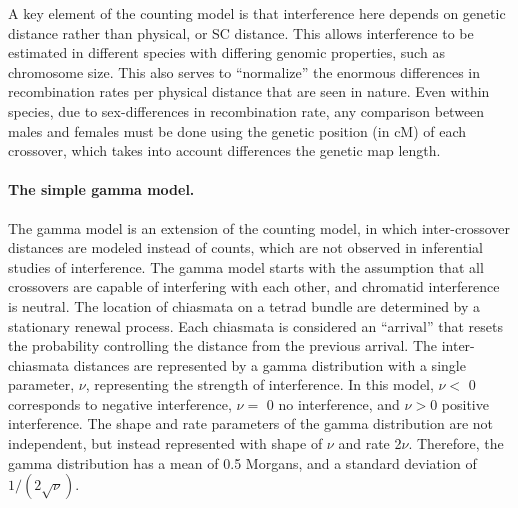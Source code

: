 A key element of the counting model is that interference here depends on genetic distance rather than physical, or SC distance.
This allows interference to be estimated in different species with differing genomic properties, such as chromosome size.
This also serves to ``normalize'' the enormous differences in recombination rates per physical distance that are seen in nature.
Even within species, due to sex-differences in recombination rate, any comparison between males and females must be done using the genetic position (in cM) of each crossover, which takes into account differences the genetic map length.




\paragraph{The simple gamma model.} \label{cointTPM}

The gamma model is an extension of the counting model, in which inter-crossover distances are modeled instead of counts, which are not observed in inferential studies of interference.
The gamma model starts with the assumption that all crossovers are capable of interfering with each other, and chromatid interference is neutral.
The location of chiasmata on a tetrad bundle are determined by a stationary renewal process.
Each chiasmata is considered an ``arrival'' that resets the probability controlling the distance from the previous arrival.
The inter-chiasmata distances are represented by a gamma distribution with a single parameter, $\nu$, representing the strength of interference.
In this model, $\nu <$ 0 corresponds to negative interference, $\nu=$ 0 no interference, and $\nu>$0 positive interference.
The shape and rate parameters of the gamma distribution are not independent, but instead represented with shape of $\nu$ and rate 2$\nu$.
Therefore, the gamma distribution has a mean of 0.5 Morgans, and a standard deviation of $1 / ( 2 \sqrt{\nu} )$.


